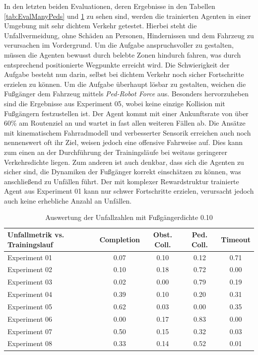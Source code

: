 In den letzten beiden Evaluationen, deren Ergebnisse in den Tabellen \ref{tab:EvalManyPeds}
und \ref{tab:EvalVeryCrowded} zu sehen sind, werden die trainierten Agenten in einer Umgebung
mit sehr dichtem Verkehr getestet. Hierbei steht die Unfallvermeidung, ohne Schäden an Personen,
Hindernissen und dem Fahrzeug zu verursachen im Vordergrund. Um die Aufgabe anspruchsvoller
zu gestalten, müssen die Agenten bewusst durch belebte Zonen hindurch fahren, was durch
entsprechend positionierte Wegpunkte erreicht wird. Die Schwierigkeit der Aufgabe besteht nun
darin, selbst bei dichtem Verkehr noch sicher Fortschritte erzielen zu können. Um die Aufgabe
überhaupt lösbar zu gestalten, weichen die Fußgänger dem Fahrzeug mittels \emph{Ped-Robot Force}
aus. Besonders hervorzuheben sind die Ergebnisse aus Experiment 05, wobei keine einzige
Kollision mit Fußgängern festzustellen ist. Der Agent kommt mit einer Ankunftsrate von
über 60\% am Routenziel an und wartet in fast allen weiteren Fällen ab. Die Ansätze
mit kinematischem Fahrradmodell und verbesserter Sensorik erreichen auch noch nennenswert
oft ihr Ziel, weisen jedoch eine offensive Fahrweise auf. Dies kann zum einen an der
Durchführung der Trainingsläufe bei weitaus geringerer Verkehrsdichte liegen.
Zum anderen ist auch denkbar, dass sich die Agenten zu sicher sind, die Dynamiken
der Fußgänger korrekt einschätzen zu können, was anschließend zu Unfällen führt.
Der mit komplexer Rewardstruktur trainierte Agent aus Experiment 01 kann nur schwer
Fortschritte erzielen, verursacht jedoch auch keine erhebliche Anzahl an Unfällen.

\begin{table}[h]
\centering
\begin{tabular}{ |p{3cm}||c|c|c|c| }
 \hline
 Unfallmetrik vs. Trainingslauf & Completion & Obst. Coll. & Ped. Coll. & Timeout \\
 \hline \hline
 Experiment 01 & 0.07 & 0.10 & 0.12 & 0.71 \\ \hline
 Experiment 02 & 0.10 & 0.18 & 0.72 & 0.00 \\ \hline
 Experiment 03 & 0.02 & 0.00 & 0.79 & 0.19 \\ \hline
 Experiment 04 & 0.39 & 0.10 & 0.20 & 0.31 \\ \hline
 Experiment 05 & 0.62 & 0.03 & 0.00 & 0.35 \\ \hline
 Experiment 06 & 0.00 & 0.17 & 0.83 & 0.00 \\ \hline
 Experiment 07 & 0.50 & 0.15 & 0.32 & 0.03 \\ \hline
 Experiment 08 & 0.33 & 0.14 & 0.52 & 0.01 \\
 \hline
\end{tabular}
\caption{Auswertung der Unfallzahlen mit Fußgängerdichte 0.10}
 \label{tab:EvalVeryCrowded}
\end{table}


